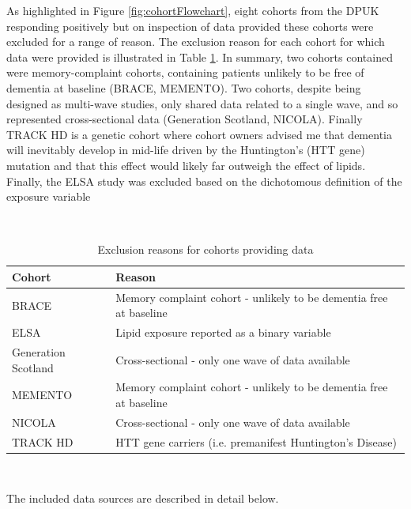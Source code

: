 \documentclass[a4paper, twoside]{templates/ociamthesis}
\begin{document}
As highlighted in Figure \ref{fig:cohortFlowchart}, eight cohorts from the DPUK responding positively but on inspection of data provided these cohorts were excluded for a range of reason. The exclusion reason for each cohort for which data were provided is illustrated in Table \ref{tab:dataExcluded-table}. In summary, two cohorts contained were memory-complaint cohorts, containing patients unlikely to be free of dementia at baseline (BRACE, MEMENTO). Two cohorts, despite being designed as multi-wave studies, only shared data related to a single wave, and so represented cross-sectional data (Generation Scotland, NICOLA). Finally TRACK HD is a genetic cohort where cohort owners advised me that dementia will inevitably develop in mid-life driven by the Huntington's (HTT gene) mutation and that this effect would likely far outweigh the effect of lipids. Finally, the ELSA study was excluded based on the dichotomous definition of the exposure variable

~\\




\begin{table}[H]

\caption[Exclusion reasons for cohorts providing data]{\label{tab:dataExcluded-table}Exclusion reasons for cohorts providing data}
\centering
\begin{tabular}[t]{>{\raggedright\arraybackslash}p{12em}>{\raggedright\arraybackslash}p{20em}}
\toprule
\textbf{Cohort} & \textbf{Reason}\\
\midrule
BRACE & Memory complaint cohort - unlikely to be dementia free at baseline\\
\midrule
ELSA & Lipid exposure reported as a binary variable\\
\midrule
Generation Scotland & Cross-sectional - only one wave of data available\\
\midrule
MEMENTO & Memory complaint cohort - unlikely to be dementia free at baseline\\
\midrule
NICOLA & Cross-sectional - only one wave of data available\\
\midrule
\addlinespace
TRACK HD & HTT gene carriers (i.e. premanifest Huntington's Disease)\\
\bottomrule
\end{tabular}
\end{table}

~

The included data sources are described in detail below.
\end{document}
